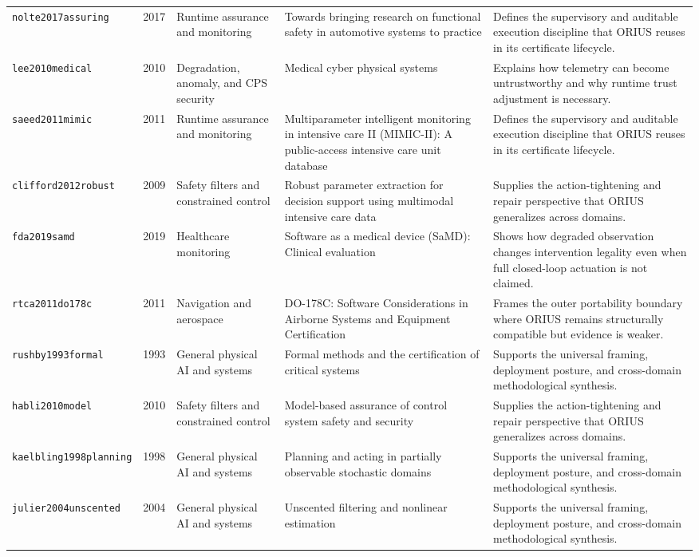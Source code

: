\begin{longtable}{p{}p{}p{}p{}p{}}
\texttt{nolte2017assuring} & 2017 & Runtime assurance and monitoring & Towards bringing research on functional safety in automotive systems to practice & Defines the supervisory and auditable execution discipline that ORIUS reuses in its certificate lifecycle.\\
\texttt{lee2010medical} & 2010 & Degradation, anomaly, and CPS security & Medical cyber physical systems & Explains how telemetry can become untrustworthy and why runtime trust adjustment is necessary.\\
\texttt{saeed2011mimic} & 2011 & Runtime assurance and monitoring & Multiparameter intelligent monitoring in intensive care II (MIMIC-II): A public-access intensive care unit database & Defines the supervisory and auditable execution discipline that ORIUS reuses in its certificate lifecycle.\\
\texttt{clifford2012robust} & 2009 & Safety filters and constrained control & Robust parameter extraction for decision support using multimodal intensive care data & Supplies the action-tightening and repair perspective that ORIUS generalizes across domains.\\
\texttt{fda2019samd} & 2019 & Healthcare monitoring & Software as a medical device (SaMD): Clinical evaluation & Shows how degraded observation changes intervention legality even when full closed-loop actuation is not claimed.\\
\texttt{rtca2011do178c} & 2011 & Navigation and aerospace & DO-178C: Software Considerations in Airborne Systems and Equipment Certification & Frames the outer portability boundary where ORIUS remains structurally compatible but evidence is weaker.\\
\texttt{rushby1993formal} & 1993 & General physical AI and systems & Formal methods and the certification of critical systems & Supports the universal framing, deployment posture, and cross-domain methodological synthesis.\\
\texttt{habli2010model} & 2010 & Safety filters and constrained control & Model-based assurance of control system safety and security & Supplies the action-tightening and repair perspective that ORIUS generalizes across domains.\\
\texttt{kaelbling1998planning} & 1998 & General physical AI and systems & Planning and acting in partially observable stochastic domains & Supports the universal framing, deployment posture, and cross-domain methodological synthesis.\\
\texttt{julier2004unscented} & 2004 & General physical AI and systems & Unscented filtering and nonlinear estimation & Supports the universal framing, deployment posture, and cross-domain methodological synthesis.\\

\end{longtable}
